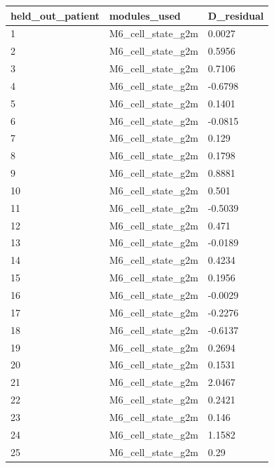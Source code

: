 \begin{longtable}{lll}
\hline\hline
held\_out\_patient & modules\_used & D\_residual \\
\hline\endhead
1 & M6\_cell\_state\_g2m & 0.0027 \\
2 & M6\_cell\_state\_g2m & 0.5956 \\
3 & M6\_cell\_state\_g2m & 0.7106 \\
4 & M6\_cell\_state\_g2m & -0.6798 \\
5 & M6\_cell\_state\_g2m & 0.1401 \\
6 & M6\_cell\_state\_g2m & -0.0815 \\
7 & M6\_cell\_state\_g2m & 0.129 \\
8 & M6\_cell\_state\_g2m & 0.1798 \\
9 & M6\_cell\_state\_g2m & 0.8881 \\
10 & M6\_cell\_state\_g2m & 0.501 \\
11 & M6\_cell\_state\_g2m & -0.5039 \\
12 & M6\_cell\_state\_g2m & 0.471 \\
13 & M6\_cell\_state\_g2m & -0.0189 \\
14 & M6\_cell\_state\_g2m & 0.4234 \\
15 & M6\_cell\_state\_g2m & 0.1956 \\
16 & M6\_cell\_state\_g2m & -0.0029 \\
17 & M6\_cell\_state\_g2m & -0.2276 \\
18 & M6\_cell\_state\_g2m & -0.6137 \\
19 & M6\_cell\_state\_g2m & 0.2694 \\
20 & M6\_cell\_state\_g2m & 0.1531 \\
21 & M6\_cell\_state\_g2m & 2.0467 \\
22 & M6\_cell\_state\_g2m & 0.2421 \\
23 & M6\_cell\_state\_g2m & 0.146 \\
24 & M6\_cell\_state\_g2m & 1.1582 \\
25 & M6\_cell\_state\_g2m & 0.29 \\
\hline\hline\end{longtable}
